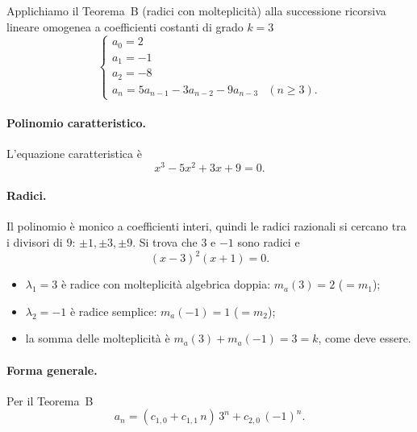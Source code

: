 \documentclass[11pt,a4paper]{article}
\begin{document}
Applichiamo il Teorema~B (radici con molteplicità) alla successione ricorsiva lineare omogenea a coefficienti costanti di grado $k = 3$
\[
\begin{cases}
a_0 = 2 \\
a_1 = -1 \\
a_2 = -8 \\
a_n = 5a_{n-1} - 3a_{n-2} - 9a_{n-3} & (n \geq 3).
\end{cases}
\]

\paragraph{Polinomio caratteristico.} L'equazione caratteristica è
\[
x^3 - 5x^2 + 3x + 9 = 0 .
\]

\paragraph{Radici.} Il polinomio è monico a coefficienti interi, quindi le radici razionali si cercano tra i divisori di $9$: $\pm 1, \pm 3, \pm 9$. Si trova che $3$ e $-1$ sono radici e
\[
(x - 3)^2 (x + 1) = 0 .
\]
\begin{itemize}
    \item $\lambda_1 = 3$ è radice con molteplicità algebrica doppia: $m_a(3) = 2$ ($= m_1$);
    \item $\lambda_2 = -1$ è radice semplice: $m_a(-1) = 1$ ($= m_2$);
    \item la somma delle molteplicità è $m_a(3) + m_a(-1) = 3 = k$, come deve essere.
\end{itemize}

\paragraph{Forma generale.} Per il Teorema~B
\[
a_n = (c_{1,0} + c_{1,1}\, n)\, 3^n + c_{2,0}\, (-1)^n .
\]
\end{document}
